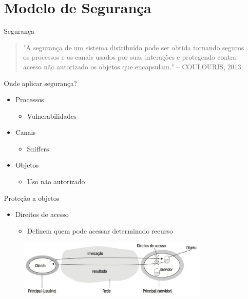 \documentclass[aspectratio=169,
				xcolor=table]{beamer}
\begin{document}
	\section{Modelo de Segurança}	
	
	\begin{frame}{Segurança}
	\begin{quote}
	\Large
	"A segurança de um sistema distribuído pode ser obtida tornando seguros os processos e os canais usados por suas interações e protegendo contra acesso não autorizado os objetos que encapsulam." – COULOURIS, 2013

	\end{quote}
	\end{frame}
	
	\begin{frame}{Onde aplicar segurança?}
		\begin{itemize}
			\item Processos
			\begin{itemize}
				\item Vulnerabilidades 
			\end{itemize}
			\vspace{1em}			
			\item Canais
			\begin{itemize}
				\item Sniffers
			\end{itemize}
			\vspace{1em}
			\item Objetos
			\begin{itemize}
				\item Uso não autorizado
			\end{itemize}
		\end{itemize}
	\end{frame}
	
	\begin{frame}{Proteção a objetos}
		\begin{itemize}
			\item Direitos de acesso
			\begin{itemize}
				\item Definem quem pode acessar determinado recurso
			\end{itemize}
		\end{itemize}
				
		\begin{figure}[hbtp]
		\centering
		\includegraphics[width=0.85\textwidth, keepaspectratio]{../figs/cap03/protecaoobjeto.png}
		\end{figure}	
	\end{frame}
	
\end{document}
